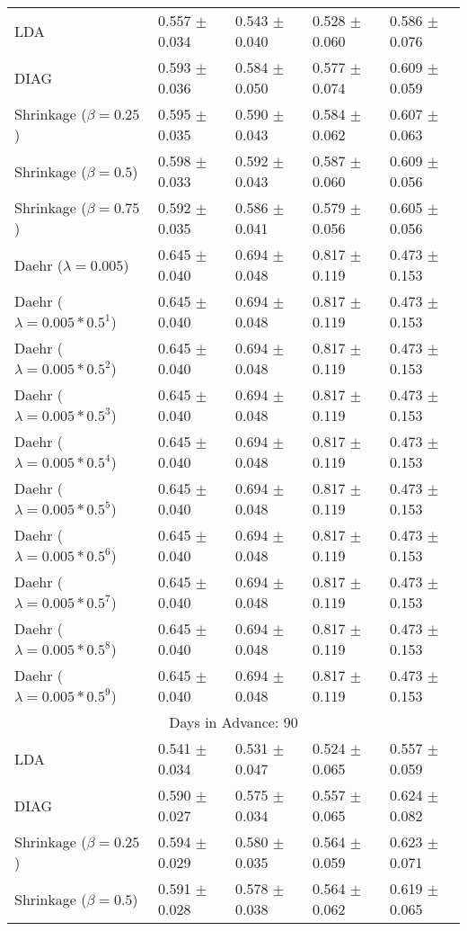 \begin{table}
\begin{tabular}{*{5}{l}}
LDA&0.557 $\pm$ 0.034&0.543 $\pm$ 0.040&0.528 $\pm$ 0.060&0.586 $\pm$ 0.076\\
DIAG&0.593 $\pm$ 0.036&0.584 $\pm$ 0.050&0.577 $\pm$ 0.074&0.609 $\pm$ 0.059\\
Shrinkage ($\beta=0.25$)&0.595 $\pm$ 0.035&0.590 $\pm$ 0.043&0.584 $\pm$ 0.062&0.607 $\pm$ 0.063\\
Shrinkage ($\beta=0.5$)&0.598 $\pm$ 0.033&0.592 $\pm$ 0.043&0.587 $\pm$ 0.060&0.609 $\pm$ 0.056\\
Shrinkage ($\beta=0.75$)&0.592 $\pm$ 0.035&0.586 $\pm$ 0.041&0.579 $\pm$ 0.056&0.605 $\pm$ 0.056\\
Daehr ($\lambda=0.005$)&0.645 $\pm$ 0.040&0.694 $\pm$ 0.048&0.817 $\pm$ 0.119&0.473 $\pm$ 0.153\\
Daehr ($\lambda=0.005*0.5^1$)&0.645 $\pm$ 0.040&0.694 $\pm$ 0.048&0.817 $\pm$ 0.119&0.473 $\pm$ 0.153\\
Daehr ($\lambda=0.005*0.5^2$)&0.645 $\pm$ 0.040&0.694 $\pm$ 0.048&0.817 $\pm$ 0.119&0.473 $\pm$ 0.153\\
Daehr ($\lambda=0.005*0.5^3$)&0.645 $\pm$ 0.040&0.694 $\pm$ 0.048&0.817 $\pm$ 0.119&0.473 $\pm$ 0.153\\
Daehr ($\lambda=0.005*0.5^4$)&0.645 $\pm$ 0.040&0.694 $\pm$ 0.048&0.817 $\pm$ 0.119&0.473 $\pm$ 0.153\\
Daehr ($\lambda=0.005*0.5^5$)&0.645 $\pm$ 0.040&0.694 $\pm$ 0.048&0.817 $\pm$ 0.119&0.473 $\pm$ 0.153\\
Daehr ($\lambda=0.005*0.5^6$)&0.645 $\pm$ 0.040&0.694 $\pm$ 0.048&0.817 $\pm$ 0.119&0.473 $\pm$ 0.153\\
Daehr ($\lambda=0.005*0.5^7$)&0.645 $\pm$ 0.040&0.694 $\pm$ 0.048&0.817 $\pm$ 0.119&0.473 $\pm$ 0.153\\
Daehr ($\lambda=0.005*0.5^8$)&0.645 $\pm$ 0.040&0.694 $\pm$ 0.048&0.817 $\pm$ 0.119&0.473 $\pm$ 0.153\\
Daehr ($\lambda=0.005*0.5^9$)&0.645 $\pm$ 0.040&0.694 $\pm$ 0.048&0.817 $\pm$ 0.119&0.473 $\pm$ 0.153\\
\hline\multicolumn{5}{c}{  Days in Advance: 90}\\\hline
LDA&0.541 $\pm$ 0.034&0.531 $\pm$ 0.047&0.524 $\pm$ 0.065&0.557 $\pm$ 0.059\\
DIAG&0.590 $\pm$ 0.027&0.575 $\pm$ 0.034&0.557 $\pm$ 0.065&0.624 $\pm$ 0.082\\
Shrinkage ($\beta=0.25$)&0.594 $\pm$ 0.029&0.580 $\pm$ 0.035&0.564 $\pm$ 0.059&0.623 $\pm$ 0.071\\
Shrinkage ($\beta=0.5$)&0.591 $\pm$ 0.028&0.578 $\pm$ 0.038&0.564 $\pm$ 0.062&0.619 $\pm$ 0.065\\

\end{tabular}
\end{table}
